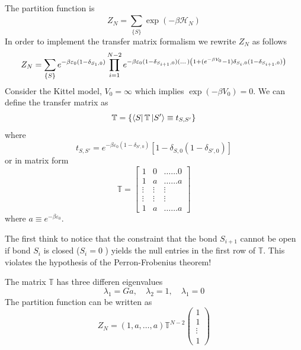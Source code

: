 \documentclass[../main/main.tex]{subfiles}
\begin{document}
The partition function is
\begin{equation*}
  Z_N = \sum_{\{ S \}  }^{} \exp (-\beta \mathcal{H}_N)
\end{equation*}
In order to implement the transfer matrix formalism we rewrite \( Z_N \) as follows
\begin{equation}
  Z_N = \sum_{\{ S \}  }^{} e^{-\beta \varepsilon _0 (1- \delta _{S_1,0})}  \prod_{i=1}^{N-2} e^{-\beta \varepsilon _0 (1- \delta _{S_{i+1},0}) \qty(\dots) \qty(1 + (e^{-\beta V_0}-1 ) \delta _{S_i,0}(1- \delta _{S_{i+1},0}))  }
\end{equation}
Consider the Kittel model, \( V_0 = \infty  \) which implies \( \exp (-\beta V_0) = 0  \). We can define the transfer matrix as
\begin{equation}
  \mathbb{T} = \{ \bra{S} \mathbb{T} \ket{S'} \equiv t_{S,S'}   \}
\end{equation}
where
\begin{equation}
t_{S,S'} = e^{-\beta \varepsilon _0 (1- \delta _{S',0})} [1 - \delta _{S,0} (1- \delta _{S',0})]
\end{equation}
or in matrix form
\begin{equation}
  \mathbb{T} =
  \begin{bmatrix}
    1 & 0 & \dots \dots 0 \\
    1 & a & \dots \dots a \\
    \vdots & \vdots   & \vdots \\
        \vdots & \vdots &  \vdots \\
        1 & a & \dots \dots  a
  \end{bmatrix}
\end{equation}
where \( a \equiv e^{-\beta \varepsilon _0}  \).

The first think to notice that the constraint that the bond \( S_{i+1} \) cannot be open if bond \( S_i \) is closed (\( S_i =0 \) ) yields the null entries in the first row of \( \mathbb{T} \). This violates the hypothesis of the Perron-Frobenius theorem!

The matrix \( \mathbb{T} \) has three differen eigenvalues
\begin{equation}
  \lambda _1 = Ga, \quad \lambda _2 =1, \quad \lambda _1 = 0
\end{equation}
The partition function can be written as
\begin{equation}
  Z_N = (1,a, \dots,a) \mathbb{T}^{N-2} \begin{pmatrix}
  1 \\
  1 \\
  \vdots \\
  1
  \end{pmatrix}
\end{equation}
\end{document}
